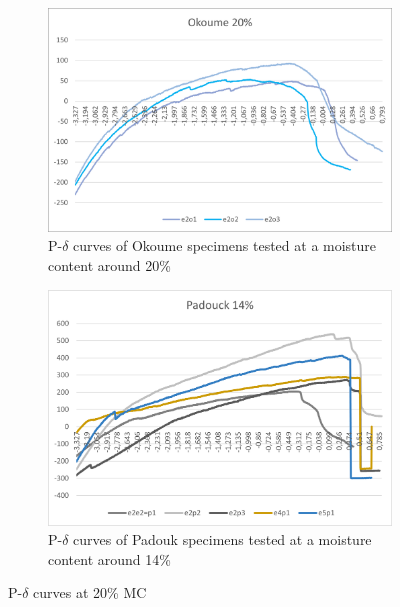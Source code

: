 \begin{figure}[h]
	\centering
	\begin{subfigure}{0.48\linewidth}
		\centering
		\includegraphics[width=\textwidth]{Figures/PDelt_OK20}
		\decoRule
		\caption[Okoume specimens tested at 20\% moisture content]{P-$\delta$ curves of Okoume specimens tested at a moisture content around 20\%}
		\label{fig:MC_Ok_20}
	\end{subfigure}
	\hfill
	\begin{subfigure}{0.48\linewidth}
		\includegraphics[scale=0.5]{Figures/PDelt_PAD14}
		\decoRule
		\caption[Padouk specimens tested at 14\% moisture content]{P-$\delta$ curves of Padouk specimens tested at a moisture content around 14\%}
		\label{fig:MC_Pad_14}
	\end{subfigure}
	\caption{P-$\delta$ curves at 20\% MC}
	\label{fig:Pdel_20_MC}
\end{figure}

